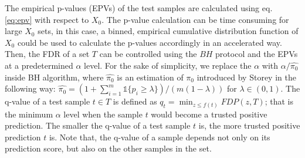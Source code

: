 \documentclass{article}
\newcommand{\mathone}{\mathds{1}}
\begin{document}
The empirical  p-values (EPVs) of the test samples are calculated using eq. \ref{eq:epv} with respect to $X_0$. The p-value calculation can be time consuming for large $X_0$ sets, in this case, a binned, empirical cumulative distribution function of $X_0$ could be used to calculate the p-values accordingly in an accelerated way. Then, the FDR of a set $T$ can be controlled using the $BH$ protocol and the EPVs at a predetermined $\alpha$ level. For the sake of simplicity, we replace the $\alpha$ with $\alpha/\hat{\pi_0}$ inside BH algorithm, where $\hat{\pi_0}$ is an estimation of $\pi_0$ introduced by Storey \cite{storey2004strong} in the following way: $\hat{\pi_0} = (1+\sum_{i=1}^m \mathone\{p_i\ge\lambda\} )/(m(1-\lambda))$ for $\lambda\in (0,1)$. The q-value of a test sample $t\in T$ is defined as $q_t=\min_{z\le f(t)}FDP( z, T )$; that is the minimum $\alpha$ level when the sample $t$ would become a trusted positive prediction. 
The smaller the q-value of a test sample $t$ is, the more trusted positive prediction $t$ is. Note that, the q-value of a sample depends not only on its prediction score, but also on the other samples in the set. 
%
\end{document}
